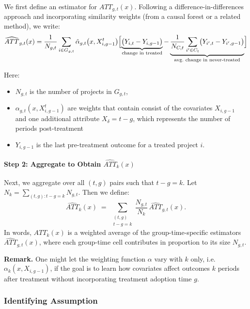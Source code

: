\documentclass[source/paper/main.tex]{subfiles}
\begin{document}
We first define an estimator for $ATT_{g,t}(x)$. Following a difference-in-differences approach and incorporating similarity weights (from a causal forest or a related method), we write:
\begin{equation}
\widehat{ATT}_{g,t}(x) 
= 
\frac{1}{N_{g,t}} \sum_{i \in G_{g,t}} \hat{\alpha}_{g,t}\bigl(x, X_{i,g-1}^t\bigr) 
\Bigl[
  \underbrace{\bigl(Y_{i,t} - Y_{i,g-1}\bigr)}_{\text{change in treated}}
  -
  \underbrace{\frac{1}{N_{C,t}} \sum_{i' \in C_t} \bigl(Y_{i',t} - Y_{i',g-1}\bigr)}_{\text{avg.\ change in never-treated}}
\Bigr]
\label{eq:att_formula}
\end{equation}

Here:
\begin{itemize}
    \item $N_{g,t}$ is the number of projects in $G_{g,t}$,
    \item $\alpha_{g,t}(x, X_{i,g-1}^t)$ are weights that contain consist of the covariates $X_{i,g-1}$ and one additional attribute $X_\delta = t-g$, which represents the number of periods post-treatment
    \item $Y_{i,g-1}$ is the last pre-treatment outcome for a treated project $i$.
\end{itemize}

\paragraph{Step 2: Aggregate to Obtain \texorpdfstring{$\widehat{ATT}_{k}(x)$}{ATT\_k(x)}}

Next, we aggregate over all $(t,g)$ pairs such that $t-g = k$. Let $N_k = \sum_{(t,g) : t - g = k} N_{g, t}$. Then we define:
\[
    \widehat{ATT}_{k}(x)
    \;=\;
    \sum_{\substack{(t,g) \\ t - g = k}}
    \frac{N_{g,t}}{N_k}
    \,\widehat{ATT}_{g,t}(x).
\]
In words, $\widehat{ATT}_{k}(x)$ is a weighted average of the group-time-specific estimators $\widehat{ATT}_{g,t}(x)$, where each group-time cell contributes in proportion to its size $N_{g,t}$.

\medskip
\noindent
\textbf{Remark.} One might let the weighting function $\alpha$ vary with $k$ only, i.e.\ $\alpha_k(x, X_{i,g-1})$, if the goal is to learn how covariates affect outcomes $k$ periods after treatment without incorporating treatment adoption time $g$. 


\subsubsection{Identifying Assumption}
\end{document}

